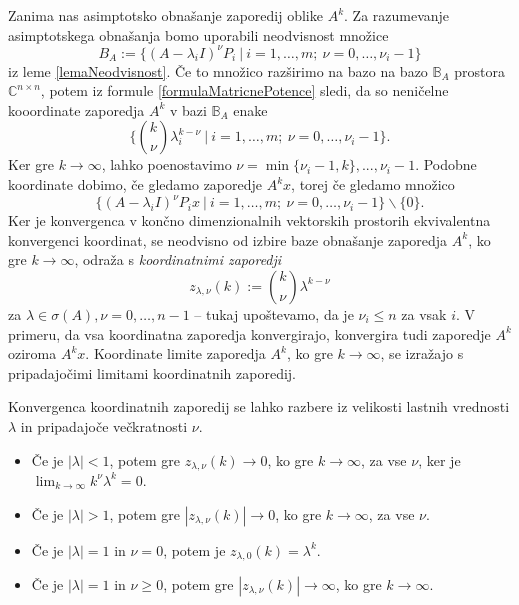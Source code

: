 \documentclass[mat1]{fmfdelo}
\newcommand{\C}{\mathbb C}
\begin{document}
Zanima nas asimptotsko obnašanje zaporedij oblike $A^k$. Za razumevanje asimptotskega obnašanja bomo uporabili neodvisnost množice
\begin{equation}
    B_A := \{(A-\lambda_i I)^{\nu} P_i\ |\ i = 1, \ldots, m;\ \nu = 0, \ldots, \nu_i - 1\}
\end{equation}
iz leme \ref{lemaNeodvisnost}. Če to množico razširimo na bazo na bazo $\mathbb{B}_A$ prostora $\C^{n \times n}$, potem iz formule \eqref{formulaMatricnePotence} sledi, da so neničelne kooordinate zaporedja $A^k$ v bazi $\mathbb{B}_A$ enake
\begin{equation}
    \Big\{{k \choose \nu} \lambda_i^{k-\nu}\ |\ i = 1, \ldots, m;\ \nu = 0, \ldots, \nu_i-1\Big\}.
\end{equation}
Ker gre $k \rightarrow \infty$, lahko poenostavimo $\nu = \min\{\nu_i-1, k\}, ..., \nu_i - 1$. Podobne koordinate dobimo, če gledamo zaporedje $A^k x$, torej če gledamo množico
\begin{equation}
    \{(A-\lambda_i I)^{\nu} P_i x\ |\ i = 1, \ldots, m;\ \nu = 0, \ldots, \nu_i - 1\} \backslash \{0\}.
\end{equation}
Ker je konvergenca v končno dimenzionalnih vektorskih prostorih ekvivalentna konvergenci koordinat, se neodvisno od izbire baze obnašanje zaporedja $A^k$, ko gre $k \rightarrow \infty$, odraža s \emph{koordinatnimi zaporedji}
\begin{equation}
    z_{\lambda, \nu} (k) := {k \choose \nu} \lambda^{k - \nu}
\end{equation}
za $\lambda \in \sigma(A), \nu = 0, \ldots, n-1$ -- tukaj upoštevamo, da je $\nu_i \leq n$ za vsak $i$. V primeru, da vsa koordinatna zaporedja konvergirajo, konvergira tudi zaporedje $A^k$ oziroma $A^k x$. Koordinate limite zaporedja $A^k$, ko gre $k \rightarrow \infty$, se izražajo s pripadajočimi limitami koordinatnih zaporedij.

Konvergenca koordinatnih zaporedij se lahko razbere iz velikosti lastnih vrednosti $\lambda$ in pripadajoče večkratnosti $\nu$.
\begin{itemize}
    \item Če je $|\lambda| < 1$, potem gre $z_{\lambda, \nu} (k) \rightarrow 0$, ko gre $k \rightarrow \infty$, za vse $\nu$, ker je $\lim_{k \rightarrow \infty} k^\nu \lambda^k = 0$.
    \item Če je $|\lambda| > 1$, potem gre $|z_{\lambda, \nu} (k)| \rightarrow 0$, ko gre $k \rightarrow \infty$, za vse $\nu$.
    \item Če je $|\lambda| = 1$ in $\nu = 0$, potem je $z_{\lambda, 0} (k) = \lambda^k$.
    \item Če je $|\lambda| = 1$ in $\nu \geq 0$, potem gre $|z_{\lambda, \nu} (k)| \rightarrow \infty$, ko gre $k \rightarrow \infty$.
\end{itemize}
\end{document}
